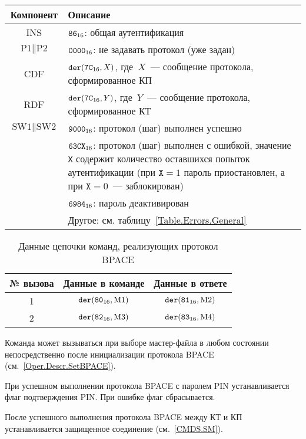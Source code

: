 \begin{table}[H]
\caption{}\label{Table.Oper.GABPACECmd}
\begin{tabular}{|c|p{14cm}|}
\hline
Компонент & 	Описание \\
\hline
\hline
INS & $\texttt{86}_{16}$: общая аутентификация \\
\hline
$\text{P1} \parallel \text{P2}$ & $\texttt{0000}_{16}$: не задавать протокол (уже задан)\\ 
\hline
CDF & $\texttt{der}(\texttt{7C}_{16}, X)$, 
где~$X$~--- сообщение протокола, сформированное КП\\ 
\hline 
\hline
RDF & $\texttt{der}(\texttt{7C}_{16}, Y)$, где~$Y$~--- 
сообщение протокола, сформированное КТ\\
\hline
$\text{SW1} \parallel \text{SW2}$ & 
  $\texttt{9000}_{16}$: протокол (шаг) выполнен успешно \\
\cline{2-2}
  & $\texttt{63CX}_{16}$: протокол (шаг) выполнен с ошибкой, 
значение \texttt{X} содержит количество оставшихся попыток аутентификации 
(при $\texttt{X} = 1$ пароль приостановлен, а при $\texttt{X} = 0$~--- 
заблокирован) \\
\cline{2-2}
  & $\texttt{6984}_{16}$: пароль деактивирован \\
\cline{2-2}
  & Другое: см. таблицу~\ref{Table.Errors.General} \\
\hline
\end{tabular}
\end{table}


\begin{table}[H]
\caption{Данные цепочки команд, реализующих протокол BPACE}
\label{Table.Oper.BPACE}
\begin{tabular}{|c|c|c|}
\hline
№ вызова & Данные в команде & Данные в ответе\\
\hline
\hline
1 & $\texttt{der}(\texttt{80}_{16}, \text{M1})$ & 
$\texttt{der}(\texttt{81}_{16}, \text{M2})$\\
\hline
2 & $\texttt{der}(\texttt{82}_{16}, \text{M3})$ & 
$\texttt{der}(\texttt{83}_{16}, \text{M4})$\\
\hline
\end{tabular}
\end{table}

Команда может вызываться при выборе мастер-файла в любом состоянии
непосредственно после инициализации протокола BPACE 
(см.~\ref{Oper.Descr.SetBPACE}). 

При успешном выполнении протокола BPACE с паролем PIN 
устанавливается флаг подтверждения PIN.
При ошибке флаг сбрасывается.

После успешного выполнения протокола BPACE между КТ и КП 
устанавливается защищенное соединение (см.~\ref{CMDS.SM}).

